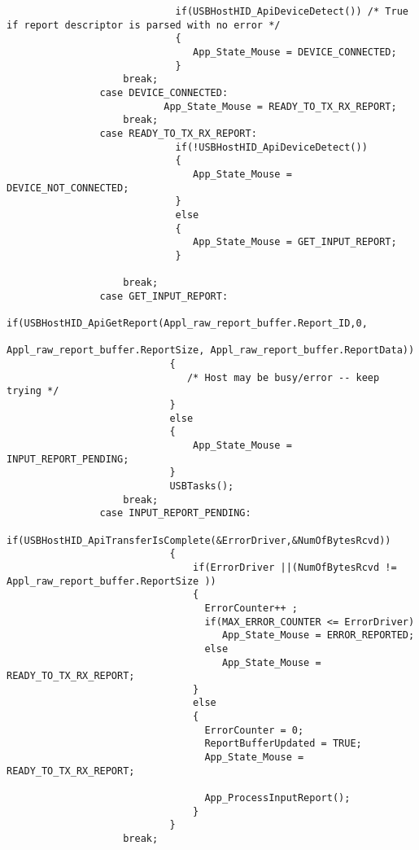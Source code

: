 \documentclass{article}
\begin{document}
\begin{verbatim}
                             if(USBHostHID_ApiDeviceDetect()) /* True if report descriptor is parsed with no error */
                             {
                                App_State_Mouse = DEVICE_CONNECTED;
                             }
                    break;
                case DEVICE_CONNECTED:
                           App_State_Mouse = READY_TO_TX_RX_REPORT;
                    break;
                case READY_TO_TX_RX_REPORT:
                             if(!USBHostHID_ApiDeviceDetect())
                             {
                                App_State_Mouse = DEVICE_NOT_CONNECTED;
                             }
                             else
                             {
                                App_State_Mouse = GET_INPUT_REPORT;
                             }

                    break;
                case GET_INPUT_REPORT:
                            if(USBHostHID_ApiGetReport(Appl_raw_report_buffer.Report_ID,0,
                                                        Appl_raw_report_buffer.ReportSize, Appl_raw_report_buffer.ReportData))
                            {
                               /* Host may be busy/error -- keep trying */
                            }
                            else
                            {
                                App_State_Mouse = INPUT_REPORT_PENDING;
                            }
                            USBTasks();
                    break;
                case INPUT_REPORT_PENDING:
                           if(USBHostHID_ApiTransferIsComplete(&ErrorDriver,&NumOfBytesRcvd))
                            {
                                if(ErrorDriver ||(NumOfBytesRcvd != Appl_raw_report_buffer.ReportSize ))
                                {
                                  ErrorCounter++ ; 
                                  if(MAX_ERROR_COUNTER <= ErrorDriver)
                                     App_State_Mouse = ERROR_REPORTED;
                                  else
                                     App_State_Mouse = READY_TO_TX_RX_REPORT;
                                }
                                else
                                {
                                  ErrorCounter = 0; 
                                  ReportBufferUpdated = TRUE;
                                  App_State_Mouse = READY_TO_TX_RX_REPORT;

                                  App_ProcessInputReport();
                                }
                            }
                    break;


\end{verbatim}
\end{document}

